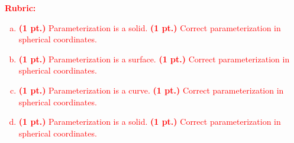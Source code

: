 \documentclass[12pt]{article} %
\begin{document}
\vspace*{1cm}
\textcolor{red}{
\noindent \textbf{Rubric:}
\begin{enumerate}[(a)]
    \item \textbf{(1 pt.)} Parameterization is a solid. \textbf{(1 pt.)} Correct parameterization in spherical coordinates.
\item \textbf{(1 pt.)} Parameterization is a surface. \textbf{(1 pt.)} Correct parameterization in spherical coordinates.
\item \textbf{(1 pt.)} Parameterization is a curve. \textbf{(1 pt.)} Correct parameterization in spherical coordinates.
\item \textbf{(1 pt.)} Parameterization is a solid. \textbf{(1 pt.)} Correct parameterization in spherical coordinates.
\end{enumerate}
}
\end{document}
